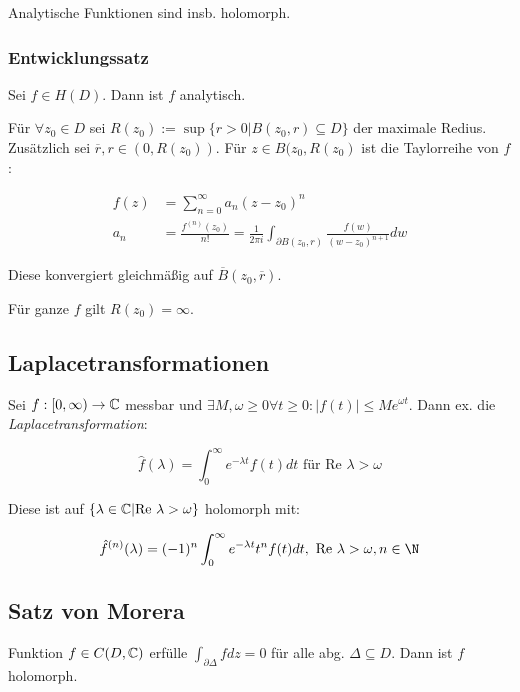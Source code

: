 \vspace*{1mm}

Analytische Funktionen sind insb. holomorph.

\subsubsection*{Entwicklungssatz}

Sei $f \in H(D)$. Dann ist $f$ analytisch.

\spacing

Für $\forall z_0 \in D$ sei $R(z_0) := \sup\{r > 0 | B(z_0,r) \subseteq D \}$ der maximale Redius. Zusätzlich sei $\overline r, r \in (0,R(z_0))$. Für $z \in B(z_0, R(z_0)$ ist die Taylorreihe von $f$:

\vspace*{-4mm}
\begin{align*}
f(z) &= \sum_{n=0}^\infty a_n(z-z_0)^n \\
a_n &= \frac{f^{(n)}(z_0)}{n!} = \frac{1}{2\pi i} \int_{\partial B(z_0,r)} \frac{f(w)}{(w-z_0)^{n+1}} dw
\end{align*}

Diese konvergiert gleichmäßig auf $\overline B(z_0,\overline r)$.

Für ganze $f$ gilt $R(z_0)=\infty$.

\subsection*{Laplacetransformationen}

Sei $f : [0,\infty) \to \mathbb{C}$ messbar und $\exists M, \omega \geq 0 \forall t \geq 0 : |f(t)| \leq Me^{\omega t}$. Dann ex. die \emph{Laplacetransformation}:

\vspace*{-2mm}
$$\hat f(\lambda) = \int_0^\infty e^{-\lambda t} f(t) dt \text{ für Re } \lambda > \omega$$

Diese ist auf $\{\lambda \in \mathbb{C} | \text{Re } \lambda > \omega\}$ holomorph mit:

\vspace*{-4mm}
$$\hat f^{(n)}(\lambda) = (-1)^n \int_0^\infty e^{-\lambda t} t^n f(t) dt, \text{ Re } \lambda > \omega, n \in \N$$

\subsection*{Satz von Morera}

Funktion $f \in C(D,\mathbb{C})$ erfülle $\int_{\partial\Delta} f dz = 0$ für alle abg. $\Delta \subseteq D$. Dann ist $f$ holomorph.

